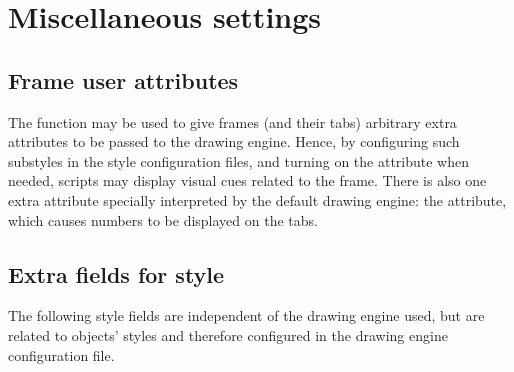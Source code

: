 \section{Miscellaneous settings}
\label{sec:grmisc}


\subsection{Frame user attributes}

The function  may be used to give frames
(and their tabs) arbitrary extra attributes to be passed to the
drawing engine. Hence, by configuring such substyles in the style
configuration files, and turning on the attribute when needed, 
scripts may display visual cues related to the frame. There is
also one extra attribute specially interpreted by the default
drawing engine: the  attribute, which causes 
numbers to be displayed on the tabs.


\subsection{Extra fields for style }

The following style fields are independent of the drawing engine used,
but are related to objects' styles and therefore configured in the drawing
engine configuration file.

